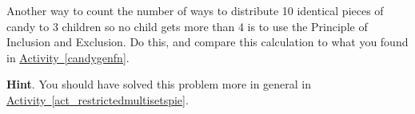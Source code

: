 \documentclass{book}
\begin{document}
\setcounter{cpjt}{256}
\addtocounter{cpjt}{-1}
\begin{activity}\label{activity-249}
\hypertarget{p-1327}{}%
Another way to count the number of ways to distribute 10 identical pieces of candy to 3 children so no child gets more than 4 is to use the Principle of Inclusion and Exclusion.  Do this, and compare this calculation to what you found in \hyperref[candygenfn]{Activity~\ref{candygenfn}}.%
\par\smallskip%
\noindent\textbf{Hint}.\hypertarget{hint-165}{}\quad%
\hypertarget{p-1328}{}%
You should have solved this problem more in general in \hyperref[act_restrictedmultisetspie]{Activity~\ref{act_restrictedmultisetspie}}.%
\end{activity}

\clearpage
\end{document}
